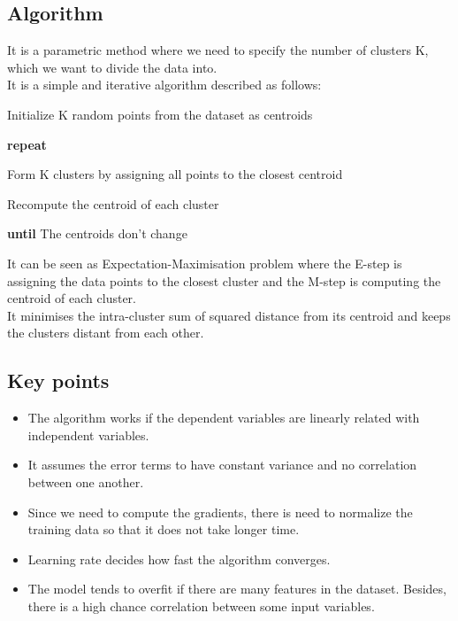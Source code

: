 \documentclass[12pt,letterpaper, onecolumn]{exam}
\begin{document}
\subsection*{Algorithm}

It is a parametric method where we need to specify the number of clusters K, which we want to divide the data into.
\\It is a simple and iterative algorithm described as follows:
\begin{mydesc}
 \item[\hspace{2cm}]\textmd{Initialize K random points from the dataset as centroids}
  \item[\hspace{2cm}]\textmd{\textbf{repeat}}
  \item[\hspace{3cm}]\textmd{Form K clusters by assigning all points to the closest centroid}
  \item[\hspace{3cm}]\textmd{Recompute the centroid of each cluster}
  \item[\hspace{2cm}]\textmd{\textbf{until} The centroids don't change}
 \end{mydesc}

It can be seen as Expectation-Maximisation problem where the E-step is assigning the data points to the closest cluster and the M-step is computing the centroid of each cluster.\\
It minimises the intra-cluster sum of squared distance from its centroid and keeps the clusters distant from each other.


\subsection*{Key points}
\begin{itemize}
\item The algorithm works if the dependent variables are linearly related with independent variables.
\item It assumes the error terms to have constant variance and no correlation between one another.
\item Since we need to compute the gradients, there is need to normalize the training data so that it does not take longer time.
\item Learning rate decides how fast the algorithm converges.
\item The model tends to overfit if there are many features in the dataset. Besides, there is a high chance correlation between some input variables.
\end{itemize}
\end{document}
